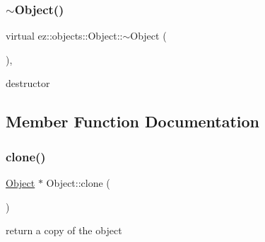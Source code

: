 \subsubsection{\texorpdfstring{$\sim$\+Object()}{~Object()}}
{\footnotesize\ttfamily virtual ez\+::objects\+::\+Object\+::$\sim$\+Object (\begin{DoxyParamCaption}{ }\end{DoxyParamCaption})\hspace{0.3cm}{\ttfamily [inline]}, {\ttfamily [virtual]}}

destructor 

\subsection{Member Function Documentation}
\mbox{\label{classez_1_1objects_1_1Object_acf444b2581d898eb4b8c92c2d5865c9e}} 
\subsubsection{\texorpdfstring{clone()}{clone()}}
{\footnotesize\ttfamily \hyperlink{classez_1_1objects_1_1Object}{Object} $\ast$ Object\+::clone (\begin{DoxyParamCaption}{ }\end{DoxyParamCaption})\hspace{0.3cm}{\ttfamily [virtual]}}

return a copy of the object 


